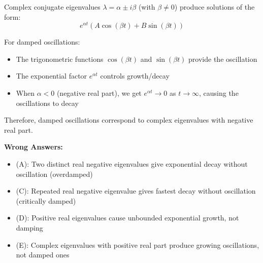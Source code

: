 \documentclass[12pt]{amsart}
\begin{document}
Complex conjugate eigenvalues $\lambda = \alpha \pm i\beta$ (with $\beta \neq 0$) produce solutions of the form:
$$e^{\alpha t}(A\cos(\beta t) + B\sin(\beta t))$$

For damped oscillations:
\begin{itemize}
\item The trigonometric functions $\cos(\beta t)$ and $\sin(\beta t)$ provide the oscillation
\item The exponential factor $e^{\alpha t}$ controls growth/decay
\item When $\alpha < 0$ (negative real part), we get $e^{\alpha t} \to 0$ as $t \to \infty$, causing the oscillations to decay
\end{itemize}

Therefore, damped oscillations correspond to complex eigenvalues with negative real part.

\textbf{Wrong Answers:}
\begin{itemize}
\item (A): Two distinct real negative eigenvalues give exponential decay without oscillation (overdamped)
\item (C): Repeated real negative eigenvalue gives fastest decay without oscillation (critically damped)
\item (D): Positive real eigenvalues cause unbounded exponential growth, not damping
\item (E): Complex eigenvalues with positive real part produce growing oscillations, not damped ones
\end{itemize}
\end{document}
